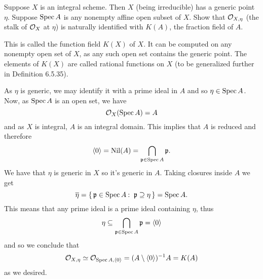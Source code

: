 \documentclass[12pt]{memoir}
\begin{document}
\begin{Ej}[5.2.I Vakil]
    Suppose $X$ is an integral scheme. Then $X$ (being irreducible)
has a generic point $\eta$. Suppose $\operatorname{Spec} A$ is any nonempty affine open subset of $X$.
Show that $\mathcal{O}_{X,\eta}$ (the stalk of $\mathcal{O}_X$ at $\eta$) is naturally identified with $K(A)$, the fraction
field of $A$.\par This is called the function field $K(X)$ of $X$. It can be computed on any
nonempty open set of $X$, as any such open set contains the generic point. The
elements of $K(X)$ are called rational functions on $X$ (to be generalized further in
Definition 6.5.35).
\end{Ej}
\begin{ptcbr}
As $\eta$ is generic, we may identify it with a prime ideal in $A$ and so $\eta\in\operatorname{Spec} A$. Now, as $\operatorname{Spec} A$ is an open set, we have 
$$\mathcal{O}_X(\operatorname{Spec} A)=A$$
and as $X$ is integral, $A$ is an integral domain. This implies that $A$ is reduced and therefore 
$$\left\langle 0\right\rangle=\operatorname{Nil}(A)=\bigcap_{\mathfrak{p}\in\operatorname{Spec} A}\mathfrak{p}.$$
We have that $\eta$ is generic in $X$ so it's generic in $A$. Taking closures inside $A$ we get 
$$\ov\eta =\set{\lie p\in\Spec A\:\ \lie p\supseteq \eta}=\Spec A.$$
This means that any prime ideal is a prime ideal containing $\eta$, thus 
$$\eta\subseteq\bigcap_{\mathfrak{p}\in\operatorname{Spec} A}\mathfrak{p}=\left\langle 0\right\rangle$$
and so we conclude that 
$$\mathcal{O}_{X,\eta}\simeq\mathcal{O}_{\operatorname{Spec} A,\left\langle 0\right\rangle}=(A\setminus\left\langle 0\right\rangle)^{-1}A=K(A)$$
as we desired.  
\end{ptcbr}
\end{document}
